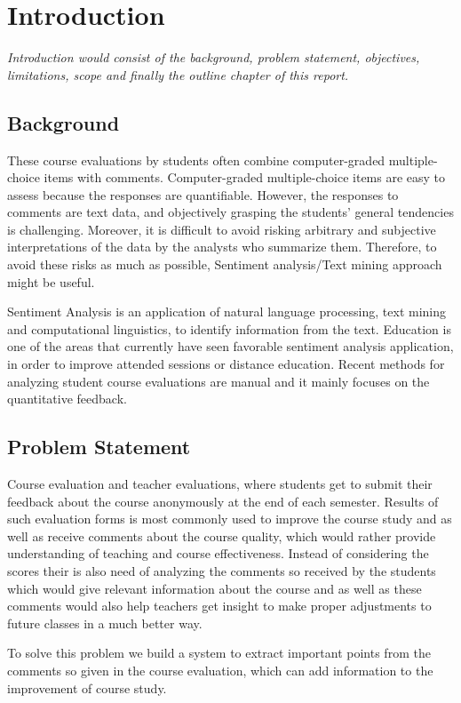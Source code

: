 \setlength{\footskip}{8mm}

\chapter{Introduction} 

\textit{Introduction would consist of the background, problem statement, objectives, limitations, scope and finally the outline chapter of this report.}

\section{Background}

\text These course evaluations by students often combine computer-graded multiple-choice items with comments. Computer-graded multiple-choice items are easy to assess because the responses are quantifiable. However, the responses to comments are text data, and objectively grasping the students’ general tendencies is challenging. Moreover, it is difficult to avoid risking arbitrary and subjective interpretations of the data by the analysts who summarize them. Therefore, to avoid these risks as much as possible, Sentiment analysis/Text mining  approach might be useful.
\par
Sentiment Analysis is an application of natural language processing, text mining and computational linguistics, to identify information from the text. Education is one of the areas that currently have seen favorable sentiment analysis application, in order to improve attended sessions or distance education. Recent methods for analyzing student course evaluations are manual and it mainly focuses on the quantitative feedback. 


\section{Problem Statement}

Course evaluation and teacher evaluations, where students get to submit their feedback about the course anonymously at the end of each semester. Results of such evaluation forms is most commonly used to improve the course study and as well as receive comments about the course quality, which would rather provide understanding of teaching and course effectiveness. 
Instead of considering the scores their is also need of analyzing the comments so received by the students which would give relevant information about the course and as well as these comments would also help teachers get insight to make proper adjustments to future classes in a much better way.\par 
To solve this problem we build a system to extract important points from the comments so given in the course evaluation, which can add information to the improvement of course study.

